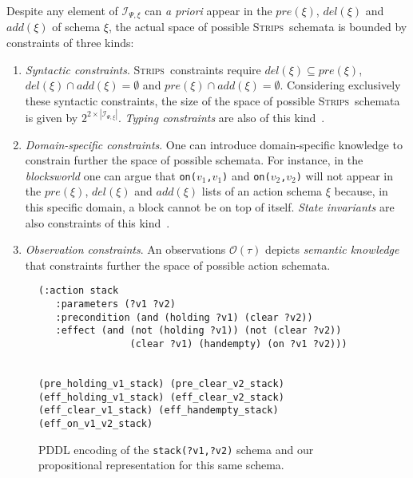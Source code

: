 \documentclass{article}
\newcommand{\strips}{\textsc{Strips}}
\begin{document}
Despite any element of ${\mathcal I}_{\Psi,\xi}$ can {\em a priori} appear in the $pre(\xi)$, $del(\xi)$ and $add(\xi)$ of schema $\xi$, the actual space of possible \strips\ schemata is bounded by constraints of three kinds:
\begin{enumerate}
\item {\em Syntactic constraints}. \strips\ constraints require $del(\xi)\subseteq pre(\xi)$, $del(\xi)\cap add(\xi)=\emptyset$ and $pre(\xi)\cap add(\xi)=\emptyset$. Considering exclusively these syntactic constraints, the size of the space of possible \strips\ schemata is given by $2^{2\times|{\mathcal I}_{\Psi,\xi}|}$. {\em Typing constraints} are also of this kind~\cite{mcdermott1998pddl}. 
\item {\em Domain-specific constraints}. One can introduce domain-specific knowledge to constrain further the space of possible schemata. For instance, in the {\em blocksworld} one can argue that {\small\tt on($v_1$,$v_1$)} and {\small\tt on($v_2$,$v_2$)} will not appear in the $pre(\xi)$, $del(\xi)$ and $add(\xi)$ lists of an action schema $\xi$ because, in this specific domain, a block cannot be on top of itself. {\it State invariants} are also constraints of this kind~\cite{fox1998automatic}. 
\item {\em Observation constraints}. An observations $\mathcal{O}(\tau)$ depicts {\em semantic knowledge} that constraints further the space of possible action schemata.   
\end{enumerate}

\begin{figure}
  \begin{tiny}  
  \begin{verbatim}
(:action stack
   :parameters (?v1 ?v2)
   :precondition (and (holding ?v1) (clear ?v2))
   :effect (and (not (holding ?v1)) (not (clear ?v2))
                (clear ?v1) (handempty) (on ?v1 ?v2)))


(pre_holding_v1_stack) (pre_clear_v2_stack)
(eff_holding_v1_stack) (eff_clear_v2_stack)
(eff_clear_v1_stack) (eff_handempty_stack) (eff_on_v1_v2_stack)
  \end{verbatim}           
  \end{tiny}  
 \caption{\small PDDL encoding of the {\tt\small stack(?v1,?v2)} schema and our propositional representation for this same schema.}
\label{fig:propositional}
\end{figure}
\end{document}
